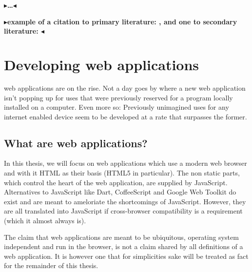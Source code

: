 \documentclass[twoside,11pt,openright]{report}
\newcommand{\todo}[1]{{\color[rgb]{.5,0,0}\textbf{$\blacktriangleright$#1$\blacktriangleleft$}}}
\begin{document}
\todo{\dots}

\todo{example of a citation to primary literature: \citeA{lazypropagation2010},
and one to secondary literature: \citeB{ambiguity2010}}


\chapter{Developing web applications}
web applications are on the rise. Not a day goes by where a new
web application isn't popping up for uses that were previously reserved for a
program locally installed on a computer. Even more so: Previously
unimagined uses for any internet enabled device seem to be developed
at a rate that surpasses the former.

\section{What are web applications?}
In this thesis, we will focus on web applications which use a
modern web browser and with it HTML as their basis (HTML5 in particular).
The non static parts, which control the heart of the web application,
are supplied by JavaScript.
Alternatives to JavaScript like Dart, CoffeeScript and Google Web Toolkit
do exist and are meant to ameloriate the shortcomings of JavaScript. 
However, they are all translated into JavaScript if cross-browser
compatibility is a requirement (which it almost always is).

The claim that web applications are meant to be ubiquitous,
operating system independent and run in the browser, is not a claim shared
by all definitions of a web application. It is however one that for
simplicities sake will be treated as fact for the remainder of this thesis.
\end{document}
